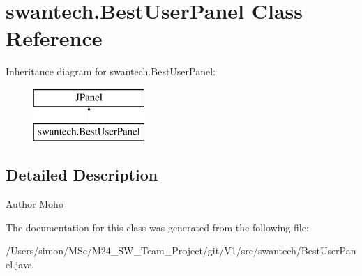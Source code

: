 \hypertarget{classswantech_1_1_best_user_panel}{}\section{swantech.\+Best\+User\+Panel Class Reference}
\label{classswantech_1_1_best_user_panel}
Inheritance diagram for swantech.\+Best\+User\+Panel\+:\begin{figure}[H]
\begin{center}
\leavevmode
\includegraphics[height=2.000000cm]{classswantech_1_1_best_user_panel}
\end{center}
\end{figure}


\subsection{Detailed Description}
\begin{DoxyAuthor}{Author}
Moho 
\end{DoxyAuthor}


The documentation for this class was generated from the following file\+:\begin{DoxyCompactItemize}
\item 
/\+Users/simon/\+M\+Sc/\+M24\+\_\+\+S\+W\+\_\+\+Team\+\_\+\+Project/git/\+V1/src/swantech/Best\+User\+Panel.\+java\end{DoxyCompactItemize}
